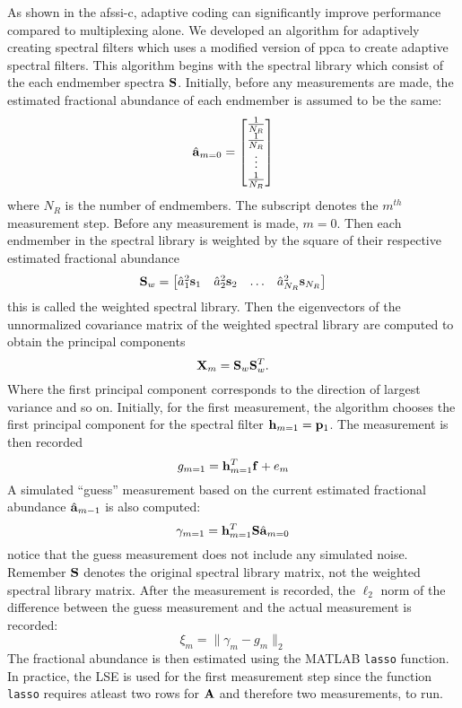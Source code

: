 As shown in the \gls{afssi-c}, adaptive coding can significantly improve performance compared to multiplexing alone. We developed an algorithm for adaptively creating spectral filters which uses a modified version of \gls{ppca} to create adaptive spectral filters. This algorithm begins with the spectral library which consist of the each endmember spectra $\displaystyle \mathbf{S}$. Initially, before any measurements are made, the estimated fractional abundance of each endmember is assumed to be the same: 
%
\begin{equation}
	\hat{ \displaystyle \mathbf{a} }_{m=0} = 
	\begin{bmatrix}
	\frac{1}{N_R} \\
	\frac{1}{N_R} \\
	\vdots \\
	\frac{1}{N_R}
	\end{bmatrix}
\end{equation}
%
where $N_R$ is the number of endmembers. The subscript denotes the $m^{th}$ measurement step. Before any measurement is made, $m=0$. Then each endmember in the spectral library is weighted by the square of their respective estimated fractional abundance
%
\begin{equation}
	\displaystyle \mathbf{S}_w = 
	\begin{bmatrix}
		\hat{a}_1^2 \displaystyle \mathbf{s}_1 & \hat{a}_2^2 \displaystyle \mathbf{s}_2 & \hdots & \hat{a}_{N_R}^2 \displaystyle \mathbf{s}_{N_R}
	\end{bmatrix}
	\label{eq:weightedSpectralLibrary}
\end{equation}
%
this is called the weighted spectral library. Then the eigenvectors of the unnormalized covariance matrix of the weighted spectral library are computed to obtain the principal components
%
\begin{equation}
	\displaystyle \mathbf{X}_m = \displaystyle \mathbf{S}_w \displaystyle \mathbf{S}_w^T.
\end{equation}
%
Where the first principal component corresponds to the direction of largest variance and so on. Initially, for the first measurement, the algorithm chooses the first principal component for the spectral filter $\displaystyle \mathbf{h}_{m=1} = \displaystyle \mathbf{p}_1$. The measurement is then recorded
%
\begin{equation}
	g_{m=1} = \displaystyle \mathbf{h}_{m=1}^{T} \displaystyle \mathbf{f} + e_{m}
\end{equation}
%
A simulated ``guess'' measurement based on the current estimated fractional abundance $\hat{ \displaystyle \mathbf{a} }_{m -1}$ is also computed:
% 
\begin{equation}
	\gamma_{m=1} = \displaystyle \mathbf{h}_{m=1}^{T} \displaystyle \mathbf{S} \hat{ \displaystyle \mathbf{a} }_{m=0}
\end{equation}
%
notice that the guess measurement does not include any simulated noise. Remember $\displaystyle \mathbf{S}$ denotes the original spectral library matrix, not the weighted spectral library matrix. After the measurement is recorded, the $\ell_2$ norm of the difference between the guess measurement and the actual measurement is recorded:
%
\begin{equation}
	\xi_m = \| \gamma_m - g_m \|_2 
\end{equation}
%
The fractional abundance is then estimated using the MATLAB \texttt{lasso} function. In practice, the LSE is used for the first measurement step since the function \texttt{lasso} requires atleast two rows for $\displaystyle \mathbf{A}$ and therefore two measurements, to run. 

